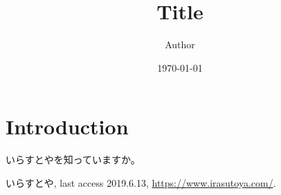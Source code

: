 \documentclass[uplatex, 10pt]{jsarticle}
\begin{document}
\title{Title}
\author{Author}
\date{\today}
\maketitle

\section{Introduction}
いらすとや\cite{irasutoya}を知っていますか。

\begin{thebibliography}{99}
   いらすとや, last access 2019.6.13, \url{https://www.irasutoya.com/}.
\end{thebibliography}
\end{document}
